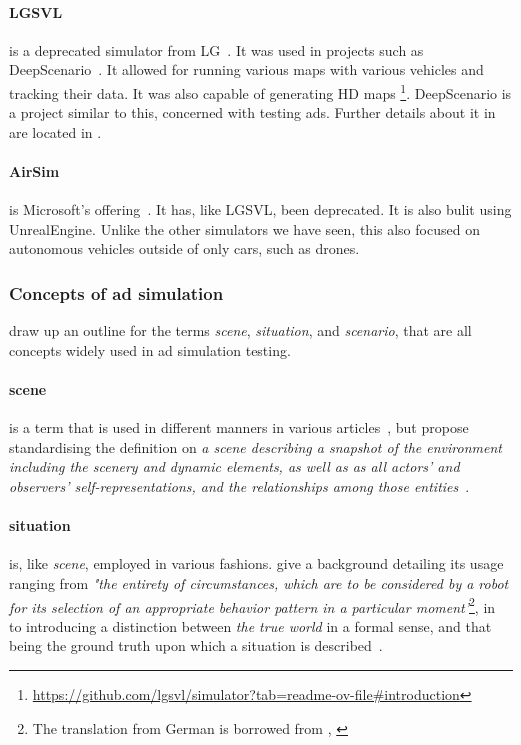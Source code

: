 \paragraph{LGSVL} is a deprecated simulator from LG~\cite{lgsvl}. It was used in projects such
as DeepScenario~\cite{DeepScenario}. It allowed for running various maps with various vehicles and
tracking their data. It was also capable of generating HD
maps \footnote{\url{https://github.com/lgsvl/simulator?tab=readme-ov-file\#introduction}}.
DeepScenario is a project similar to this, concerned with testing \acrlong{ads}. Further details
about it in are located in .

\paragraph{AirSim} is Microsoft's offering~\cite{airsim}. It has, like LGSVL,
been deprecated. It is also bulit using UnrealEngine. Unlike the other
simulators we have seen, this also focused on autonomous vehicles outside of
only cars, such as drones.


\subsubsection*{Concepts of \acrshort{ad} simulation}\label{sec:adsSimConcepts}

\citeauthor{scenes} draw up an outline for the terms \textit{scene}, \textit{situation}, and
\textit{scenario}, that are all concepts widely used in \acrshort{ad} simulation testing.

\paragraph{scene} is a term that is used in different manners in various
articles~\cite[982]{scenes}, but \citeauthor{scenes} propose standardising the definition on
\textit{a scene describing a snapshot of the environment including the scenery and dynamic elements,
    as well as  as all actors’ and observers’ self-representations, and the relationships among those entities}~\cite[983]{scenes}.

\paragraph{situation} is, like \textit{scene}, employed in various fashions. \citeauthor{scenes}
give a background detailing its usage ranging from \textit{"the entirety of circumstances,
    which are to be considered by a robot for its selection of an appropriate behavior pattern in a
    particular moment'}\footnote{The translation from German is borrowed from \citeauthor{scenes},
    \cite[984]{scenes}}, in  \citeauthor{scenarioTysk}~\cite[3]{scenarioTysk} to
\citeauthor{schmidtScenario} introducing a distinction between \textit{the true world} in a formal
sense, and that being the ground truth upon which a situation is
described~\cite[892]{schmidtScenario}.

